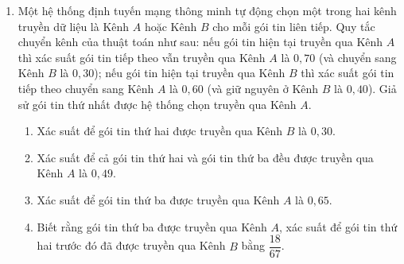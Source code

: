 \documentclass[12pt,a4paper]{article}
\begin{document}
\begin{enumerate}[label=\textbf{Câu \arabic*:}, leftmargin=*]
\item Một hệ thống định tuyến mạng thông minh tự động chọn một trong hai kênh truyền dữ liệu là Kênh $A$ hoặc Kênh $B$ cho mỗi gói tin liên tiếp. Quy tắc chuyển kênh của thuật toán như sau: nếu gói tin hiện tại truyền qua Kênh $A$ thì xác suất gói tin tiếp theo vẫn truyền qua Kênh $A$ là $0{,}70$ (và chuyển sang Kênh $B$ là $0{,}30$); nếu gói tin hiện tại truyền qua Kênh $B$ thì xác suất gói tin tiếp theo chuyển sang Kênh $A$ là $0{,}60$ (và giữ nguyên ở Kênh $B$ là $0{,}40$). Giả sử gói tin thứ nhất được hệ thống chọn truyền qua Kênh $A$.
\begin{enumerate}[label=\alph*)]
    \item Xác suất để gói tin thứ hai được truyền qua Kênh $B$ là $0{,}30$.
    \item Xác suất để cả gói tin thứ hai và gói tin thứ ba đều được truyền qua Kênh $A$ là $0{,}49$.
    \item Xác suất để gói tin thứ ba được truyền qua Kênh $A$ là $0{,}65$.
    \item Biết rằng gói tin thứ ba được truyền qua Kênh $A$, xác suất để gói tin thứ hai trước đó đã được truyền qua Kênh $B$ bằng $\dfrac{18}{67}$.
\end{enumerate}


\end{enumerate}
\end{document}

